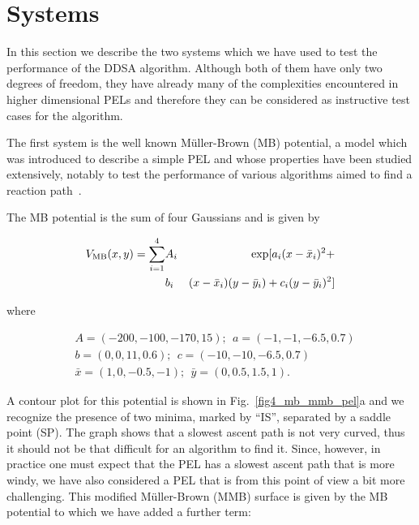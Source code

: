 \documentclass[aip,pre,twocolumn,reprint]{revtex4-1}
\begin{document}
\section{Systems}
\label{sec3} 

In this section we describe the two systems which we have used to test
the performance of the DDSA algorithm. Although both of them have only
two degrees of freedom, they have already many of the complexities
encountered in higher dimensional PELs and therefore they can be
considered as instructive test cases for the algorithm.

The first system is the well known M\"uller-Brown (MB) potential,
a model which was introduced to describe a simple PEL and whose
properties have been studied extensively, notably to test the
performance of various algorithms aimed to find a reaction
path~\cite{muller1979location,wales1994rearrangements,ruedenberg1994gradient,passerone2001action,doye2002saddle}.

The MB potential is the sum of four Gaussians and is given by 

\begin{eqnarray} 
V_{\rm MB}(x,y) =
\sum_{i=1}^4 &A_i&\exp[a_i(x-\bar{x}_i)^2+\\& b_i&(x-\bar{x}_i)(y-\bar{y}_i)+c_i(y-\bar{y}_i)^2]
\label{eq_6}
\end{eqnarray} 

\noindent
where 

\begin{equation} 
\begin{split} 
&A=(-200,-100,-170,15);~~a=(-1,-1,-6.5, 0.7) \\ 
&b=(0, 0, 11, 0.6);~~c=  (-10,-10,-6.5, 0.7) \\ 
&\bar{x}=(1, 0,-0.5,-1);~~\bar{y}=(0, 0.5, 1.5, 1) .
\end{split} 
\label{eq_7}
\end{equation}

A contour plot for this potential is shown in Fig.~\ref{fig4_mb_mmb_pel}a
and we recognize the presence of two minima, marked by ``IS'', separated
by a saddle point (SP). The graph shows that a slowest ascent path is
not very curved, thus it should not be that difficult for an algorithm
to find it. Since, however, in practice one must expect that the PEL has
a slowest ascent path that is more windy, we have also considered a PEL
that is from this point of view a bit more challenging. This modified
M\"uller-Brown (MMB) surface is given by the MB potential to which we
have added a further term:
\end{document}
